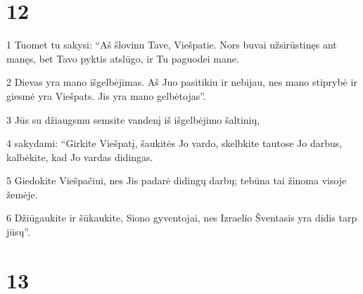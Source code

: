 \chapter{12}


\par 1 Tuomet tu sakysi: “Aš šlovinu Tave, Viešpatie. Nors buvai užsirūstinęs ant manęs, bet Tavo pyktis atslūgo, ir Tu paguodei mane. 
\par 2 Dievas yra mano išgelbėjimas. Aš Juo pasitikiu ir nebijau, nes mano stiprybė ir giesmė yra Viešpats. Jis yra mano gelbėtojas”. 
\par 3 Jūs su džiaugsmu semsite vandenį iš išgelbėjimo šaltinių, 
\par 4 sakydami: “Girkite Viešpatį, šaukitės Jo vardo, skelbkite tautose Jo darbus, kalbėkite, kad Jo vardas didingas. 
\par 5 Giedokite Viešpačiui, nes Jis padarė didingų darbų; tebūna tai žinoma visoje žemėje. 
\par 6 Džiūgaukite ir šūkaukite, Siono gyventojai, nes Izraelio Šventasis yra didis tarp jūsų”.



\chapter{13}


